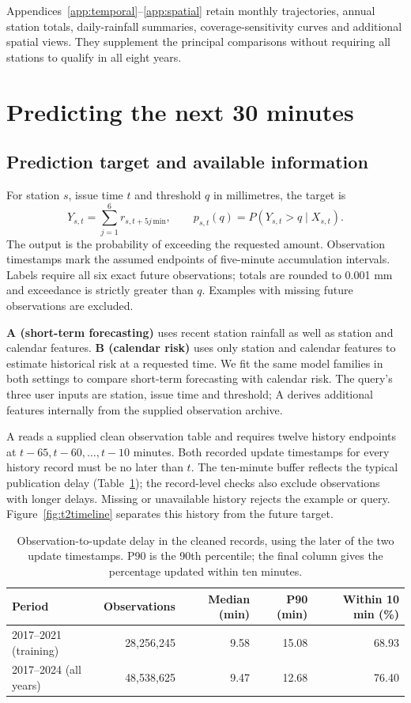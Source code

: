 \documentclass[11pt,a4paper]{article}
\begin{document}
Appendices~\ref{app:temporal}--\ref{app:spatial} retain monthly trajectories, annual station totals, daily-rainfall summaries, coverage-sensitivity curves and additional spatial views. They supplement the principal comparisons without requiring all stations to qualify in all eight years.

\FloatBarrier
\section{Predicting the next 30 minutes}
\subsection{Prediction target and available information}
For station $s$, issue time $t$ and threshold $q$ in millimetres, the target is
\[
Y_{s,t}=\sum_{j=1}^{6}r_{s,t+5j\,\mathrm{min}},\qquad
p_{s,t}(q)=P(Y_{s,t}>q\mid X_{s,t}).
\]
The output is the probability of exceeding the requested amount. Observation timestamps mark the assumed endpoints of five-minute accumulation intervals. Labels require all six exact future observations; totals are rounded to 0.001 mm and exceedance is strictly greater than $q$. Examples with missing future observations are excluded.

\textbf{A (short-term forecasting)} uses recent station rainfall as well as station and calendar features. \textbf{B (calendar risk)} uses only station and calendar features to estimate historical risk at a requested time. We fit the same model families in both settings to compare short-term forecasting with calendar risk. The query's three user inputs are station, issue time and threshold; A derives additional features internally from the supplied observation archive.

A reads a supplied clean observation table and requires twelve history endpoints at $t-65,t-60,\ldots,t-10$ minutes. Both recorded update timestamps for every history record must be no later than $t$. The ten-minute buffer reflects the typical publication delay (Table~\ref{tab:updatedelay}); the record-level checks also exclude observations with longer delays. Missing or unavailable history rejects the example or query. Figure~\ref{fig:t2timeline} separates this history from the future target.

\begin{table}[htbp]\centering\small
\begin{tabular}{lrrrr}\toprule
Period & Observations & Median (min) & P90 (min) & Within 10 min (\%)\\\midrule
2017--2021 (training) & 28,256,245 & 9.58 & 15.08 & 68.93 \\
2017--2024 (all years) & 48,538,625 & 9.47 & 12.68 & 76.40 \\
\bottomrule\end{tabular}
\caption{Observation-to-update delay in the cleaned records, using the later of the two update timestamps. P90 is the 90th percentile; the final column gives the percentage updated within ten minutes.}
\label{tab:updatedelay}
\end{table}
\end{document}
